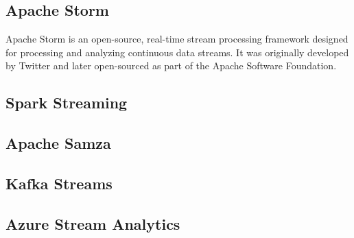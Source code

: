 \documentclass[11pt, reqno]{amsart}
\theoremstyle{definition}
\theoremstyle{remark}
\begin{document}
\subsection{Apache Storm}

Apache Storm is an open-source, real-time stream processing framework designed
for processing and analyzing continuous data streams. It was originally
developed by Twitter and later open-sourced as part of the Apache Software
Foundation.

\subsection{Spark Streaming}

\subsection{Apache Samza}

\subsection{Kafka Streams}

\subsection{Azure Stream Analytics}



\end{document}
